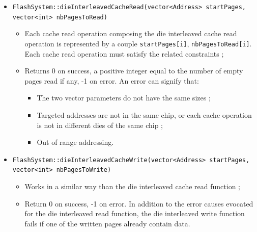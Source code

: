 \begin{itemize}
  \item \verb+FlashSystem::dieInterleavedCacheRead(vector<Address> startPages,+\\\verb+vector<int> nbPagesToRead)+
  \begin{itemize}
    \item Each cache read operation composing the die interleaved cache read operation is represented by a couple \verb+startPages[i]+, \verb+nbPagesToRead[i]+. Each cache read operation must satisfy the related constraints ;
    \item Returns 0 on success, a positive integer equal to the number of empty pages read if any, -1 on error. An error can signify that:
    \begin{itemize}
      \item The two vector parameters do not have the same sizes ;
      \item Targeted addresses are not in the same chip, or each cache operation is not in different dies of the same chip ;
      \item Out of range addressing.
    \end{itemize}
  \end{itemize}
  
  \item \verb+FlashSystem::dieInterleavedCacheWrite(vector<Address> startPages,+\\\verb+vector<int> nbPagesToWrite)+
  \begin{itemize}
    \item Works in a similar way than the die interleaved cache read function ;
    \item Return 0 on success, -1 on error. In addition to the error causes evocated for the die interleaved read function, the die interleaved write function fails if one of the written pages already contain data.
  \end{itemize}
  

\end{itemize}
